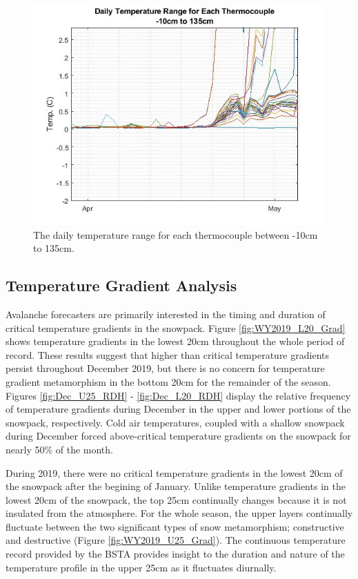  \begin{figure}[H]
    \centering
    \includegraphics[width=0.8\linewidth]{figures/DailyTempRange_Isotherm.jpg}
    \caption{The daily temperature range for each thermocouple between -10cm to 135cm.}
    \label{fig:DailyTempRange}
 \end{figure}
 
\subsection{Temperature Gradient Analysis}
Avalanche forecasters are primarily interested in the timing and duration of critical temperature gradients in the snowpack. Figure \ref{fig:WY2019_L20_Grad} shows temperature gradients in the lowest 20cm throughout the whole period of record. These results suggest that higher than critical temperature gradients persist throughout December 2019, but there is no concern for temperature gradient metamorphism in the bottom 20cm for the remainder of the season. Figures \ref{fig:Dec_U25_RDH} - \ref{fig:Dec_L20_RDH} display the relative frequency of temperature gradients during December in the upper and lower portions of the snowpack, respectively. Cold air temperatures, coupled with a shallow snowpack during December forced above-critical temperature gradients on the snowpack for nearly 50\% of the month. 

During 2019, there were no critical temperature gradients in the lowest 20cm of the snowpack after the begining of January. Unlike temperature gradients in the lowest 20cm of the snowpack, the top 25cm continually changes because it is not insulated from the atmosphere. For the whole season, the upper layers continually fluctuate between the two significant types of snow metamorphism; constructive and destructive (Figure \ref{fig:WY2019_U25_Grad}). The continuous temperature record provided by the BSTA provides insight to the duration and nature of the temperature profile in the upper 25cm as it fluctuates diurnally.  

